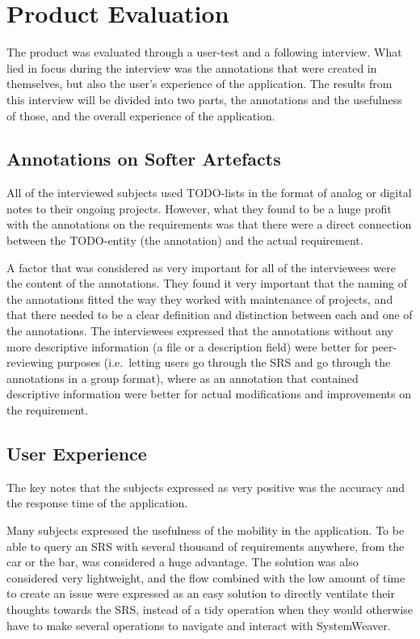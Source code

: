 \FloatBarrier

\section{Product Evaluation}
\label{sec:prodeval}
The product was evaluated through a user-test and a following interview. What lied in focus during the interview was the annotations that were created in themselves, but also the user's experience of the application. The results from this interview will be divided into two parts, the annotations and the usefulness of those, and the overall experience of the application.

\subsection{Annotations on Softer Artefacts}
All of the interviewed subjects used TODO-lists in the format of analog or digital notes to their ongoing projects. However, what they found to be a huge profit with the annotations on the requirements was that there were a direct connection between the TODO-entity (the annotation) and the actual requirement. 

A factor that was considered as very important for all of the interviewees were the content of the annotations. They found it very important that the naming of the annotations fitted the way they worked with maintenance of projects, and that there needed to be a clear definition and distinction between each and one of the annotations. The interviewees expressed that the annotations without any more descriptive information (a file or a description field) were better for peer-reviewing purposes (i.e.\ letting users go through the SRS and go through the annotations in a group format), where as an annotation that contained descriptive information were better for actual modifications and improvements on the requirement. 

\subsection{User Experience}
\label{sec:ux}

The key notes that the subjects expressed as very positive was the accuracy and the response time of the application. 

Many subjects expressed the usefulness of the mobility in the application. To be able to query an SRS with several thousand of requirements anywhere, from the car or the bar, was considered a huge advantage. The solution was also considered very lightweight, and the flow combined with the low amount of time to create an issue were expressed as an easy solution to directly ventilate their thoughts towards the SRS, instead of a tidy operation when they would otherwise have to make several operations to navigate and interact with SystemWeaver.

